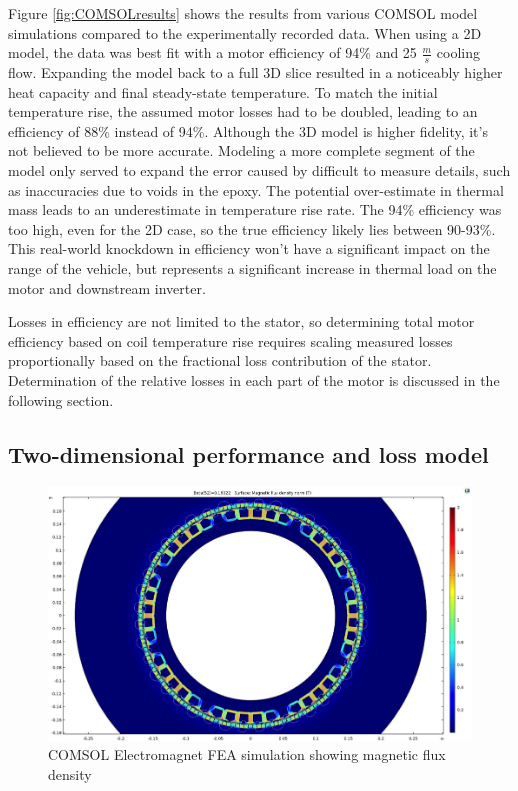 \documentclass[]{aiaa-tc}%
\begin{document}
Figure \ref{fig:COMSOLresults} shows the results from various COMSOL model simulations compared to the experimentally recorded data. When using a 2D model, the data was best fit with a motor efficiency of 94\% and 25 $\frac{m}{s}$ cooling flow. Expanding the model back to a full 3D slice resulted in a noticeably higher heat capacity and final steady-state temperature. To match the initial temperature rise, the assumed motor losses had to be doubled, leading to an efficiency of 88\% instead of 94\%. Although the 3D model is higher fidelity, it's not believed to be more accurate. Modeling a more complete segment of the model only served to expand the error caused by difficult to measure details, such as inaccuracies due to voids in the epoxy. The potential over-estimate in thermal mass leads to an underestimate in temperature rise rate. The 94\% efficiency was too high, even for the 2D case, so the true efficiency likely lies between 90-93\%. This real-world knockdown in efficiency won't have a significant impact on the range of the vehicle, but represents a significant increase in thermal load on the motor and downstream inverter.

Losses in efficiency are not limited to the stator, so determining total motor efficiency based on coil temperature rise requires scaling measured losses proportionally based on the fractional loss contribution of the stator. Determination of the relative losses in each part of the motor is discussed in the following section.

\subsection{Two-dimensional performance and loss model}

\begin{figure}[!htb]%
	\centering
	\includegraphics[width=1.0\textwidth]{figures/COMSOL_EM.png}
	\caption{COMSOL Electromagnet FEA simulation showing magnetic flux density}
	\label{fig:COMSOL_EM}
\end{figure}
\end{document}

